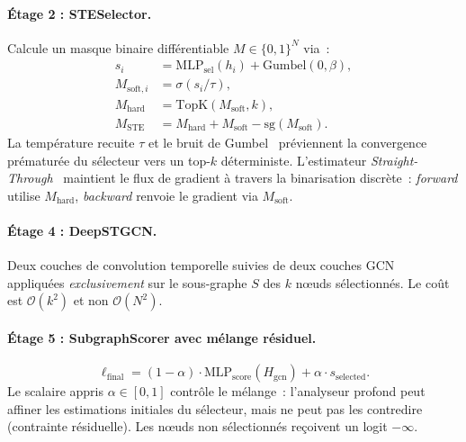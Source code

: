 \documentclass[a4paper,11pt,oneside]{report}
\begin{document}
\paragraph{\'Etage 2 : STESelector.} Calcule un masque binaire diff\'erentiable $M \in \{0,1\}^N$ via~:
\begin{equation}
  \begin{aligned}
    s_i &= \mathrm{MLP}_{\mathrm{sel}}(h_i) + \mathrm{Gumbel}(0,\beta), \\
    M_{\mathrm{soft},i} &= \sigma(s_i / \tau), \\
    M_{\mathrm{hard}} &= \mathrm{TopK}(M_{\mathrm{soft}}, k), \\
    M_{\mathrm{STE}} &= M_{\mathrm{hard}} + M_{\mathrm{soft}} - \mathrm{sg}(M_{\mathrm{soft}}).
  \end{aligned}
  \label{eq:ste-selector}
\end{equation}
La temp\'erature recuite $\tau$ et le bruit de Gumbel~\cite{jang2017gumbel} pr\'eviennent la convergence pr\'ematur\'ee du s\'electeur vers un top-$k$ d\'eterministe. L'estimateur \emph{Straight-Through}~\cite{bengio2013ste} maintient le flux de gradient \`a travers la binarisation discr\`ete~: \emph{forward} utilise $M_{\mathrm{hard}}$, \emph{backward} renvoie le gradient via $M_{\mathrm{soft}}$.

\paragraph{\'Etage 4 : DeepSTGCN.} Deux couches de convolution temporelle suivies de deux couches GCN~\cite{kipf2017gcn} appliqu\'ees \emph{exclusivement} sur le sous-graphe $S$ des $k$ nœuds s\'electionn\'es. Le co\^ut est $\mathcal{O}(k^2)$ et non $\mathcal{O}(N^2)$.

\paragraph{\'Etage 5 : SubgraphScorer avec m\'elange r\'esiduel.}
\begin{equation}
  \ell_{\mathrm{final}} = (1-\alpha) \cdot \mathrm{MLP}_{\mathrm{score}}(H_{\mathrm{gcn}}) + \alpha \cdot s_{\mathrm{selected}}.
  \label{eq:residual-blend}
\end{equation}
Le scalaire appris $\alpha \in [0,1]$ contr\^ole le m\'elange~: l'analyseur profond peut affiner les estimations initiales du s\'electeur, mais ne peut pas les contredire (contrainte r\'esiduelle). Les nœuds non s\'electionn\'es re\c{c}oivent un logit $-\infty$.
\end{document}
